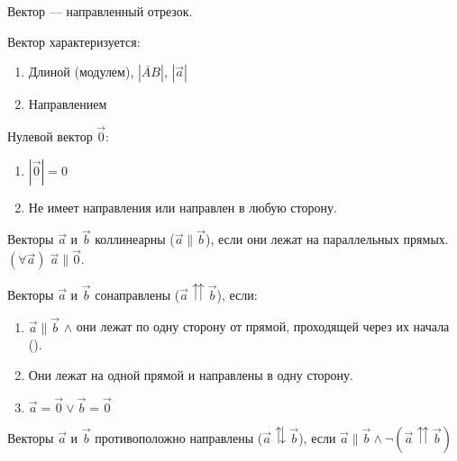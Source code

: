\documentclass{article}
\begin{document}


Вектор --- направленный отрезок.

Вектор характеризуется:
\begin{enumerate}
	\item{}Длиной (модулем), $|\lvec{AB}|$, $|\vec{a}|$
	\item{}Направлением
\end{enumerate}

Нулевой вектор $\vec{0}$:
\begin{enumerate}
	\item{}$|\vec{0}|=0$
	\item{}Не имеет направления или направлен в любую сторону.
\end{enumerate}


\begin{minipage}{0.6\linewidth}
	Векторы $\vec{a}$ и $\vec{b}$ коллинеарны ($\vec{a}\parallel\vec{b}$), если они лежат на параллельных прямых. $(\forall \vec{a})\;\vec{a}\parallel\vec{0}$.

	Векторы $\vec{a}$ и $\vec{b}$ сонаправлены ($\vec{a}\upuparrows\vec{b}$), если:
	\begin{enumerate}
		\item{}$\vec{a}\parallel\vec{b}$ $\land$ они лежат по одну сторону от прямой, проходящей через их начала ().
		\item{}Они лежат на одной прямой и направлены в одну сторону.
		\item{}$\vec{a}=\vec{0}\lor\vec{b}=\vec{0}$
	\end{enumerate}

	Векторы $\vec{a}$ и $\vec{b}$ противоположно направлены ($\vec{a}\updownarrows\vec{b}$), если $\vec{a}\parallel\vec{b}\land\lnot(\vec{a}\upuparrows\vec{b})$

\end{minipage}%
\begin{minipage}{0.4\linewidth}
	\centering
	\label{1:codirectional}
\end{minipage}
\end{document}
